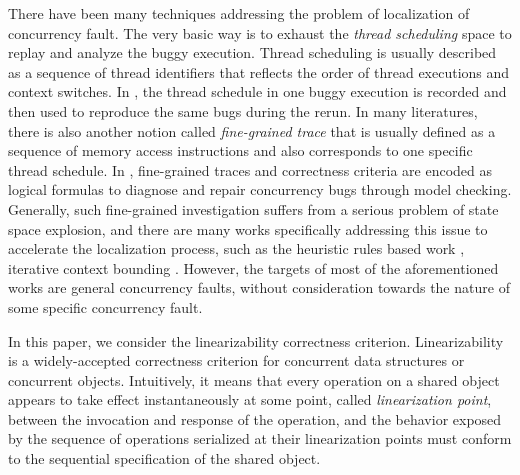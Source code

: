 \documentclass[runningheads]{llncs}
\begin{document}
There have been many techniques addressing the problem of localization of concurrency fault. The very basic way is to
exhaust the \textit{thread scheduling} space to replay and analyze the buggy execution.
Thread scheduling is usually described as a sequence of thread identifiers that reflects the order of thread executions and context switches.
 In \cite{Choi2000Deterministic,DBLP:journals/concurrency/EdelsteinFGNRU03,DBLP:journals/entcs/Stoller02}, 
 the thread schedule in one buggy execution is recorded and then used to reproduce the same bugs during the rerun. 
 In many literatures, there is also another notion called \textit{fine-grained trace} that is usually defined as a sequence of memory access instructions and 
 also corresponds to one specific thread schedule.
 In \cite{DBLP:conf/issta/KhoshnoodKW15}, 
 fine-grained traces and correctness criteria are encoded as logical formulas to diagnose and repair concurrency bugs through model checking. 
 Generally, such fine-grained investigation suffers from a serious problem of state space explosion, and
 there are many works specifically addressing this issue to accelerate the localization process, such as the heuristic rules based work
 \cite{Ben2003Heuristics}, iterative context bounding \cite{DBLP:conf/pldi/MusuvathiQ07}. 
 However, the targets of most of the aforementioned works are general concurrency faults, without consideration towards the nature of some specific concurrency fault.

In this paper, we consider the linearizability correctness criterion. Linearizability \cite{DBLP:journals/toplas/HerlihyW90} is a widely-accepted correctness criterion for concurrent data structures or concurrent objects. 
Intuitively, it means that every operation on a shared object appears to take effect instantaneously at some point, called \textit{linearization point}, 
between the invocation and response of the operation, and the behavior exposed by the sequence of operations serialized at their linearization points must conform to the sequential specification of the shared object.
\end{document}
